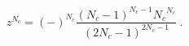 \begin{equation}\label{sqcd:roots}
z^{N_c} = (-)^{N_c} 
\frac{(N_c-1)^{N_c-1} {N_c}^{N_c}}{(2 N_c - 1)^{2 N_c-1}}~.
\end{equation}

